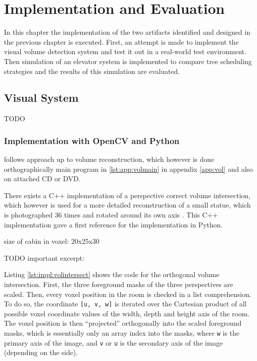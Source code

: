 \chapter{Implementation and Evaluation}
\label{chap:impl}

In this chapter the implementation of the two artifacts identified and designed in the previous chapter is executed.
First, an attempt is made to implement the visual volume detection system and test it out in a real-world test environment.
Then simulation of an elevator system is implemented to compare tree scheduling strategies and the results of this simulation are evaluated.


\section{Visual System}
TODO
\subsection{Implementation with OpenCV and Python}

follows approach up to volume reconstruction, which however is done orthographically
main program in \ref{lst:app:volmain} in appendix \ref{app:vol} and also on attached CD or DVD.

There exists a C++ implementation of a perspective correct volume intersection, which however is used for a more detailed reconstruction of a small statue, which is photographed 36 times and rotated around its own axis \autocite[][]{xocoatzin2013voxelcarving}.
This C++ implementation gave a first reference for the implementation in Python.

size of cabin in voxel: 20x25x30

TODO
important excerpt:

Listing \ref{lst:impl:volintersect} shows the code for the orthogonal volume intersection.
First, the three  foreground masks of the three perspectives are scaled.
Then, every voxel position in the room is checked in a list comprehension.
To do so, the coordinate \texttt{[u, v, w]} is iterated over the Cartesian product 
of all possible voxel coordinate values of the width, depth and height axis of the room.
The voxel position is then \enquote{projected} orthogonally into the scaled foreground masks, which is essentially only an array index into the masks, where \texttt{w} is the primary axis of the image, and \texttt{v} or \texttt{u} is the secondary axis of the image (depending on the side).

